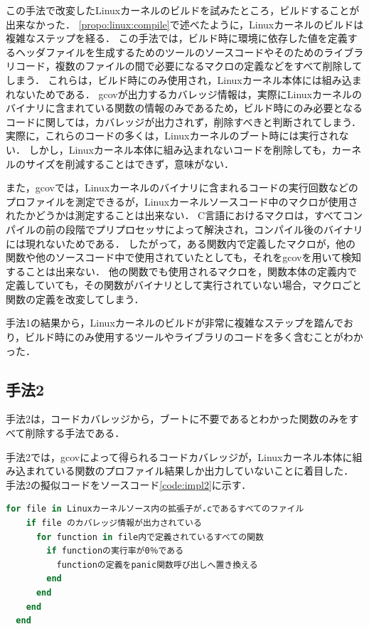 \documentclass[graduation-thesis]{mlarticle}
\begin{document}
この手法で改変したLinuxカーネルのビルドを試みたところ，ビルドすることが出来なかった．
\ref{propo:linux:compile}で述べたように，Linuxカーネルのビルドは複雑なステップを経る．
この手法では，ビルド時に環境に依存した値を定義するヘッダファイルを生成するためのツールのソースコードやそのためのライブラリコード，複数のファイルの間で必要になるマクロの定義などをすべて削除してしまう．
これらは，ビルド時にのみ使用され，Linuxカーネル本体には組み込まれないためである．
gcovが出力するカバレッジ情報は，実際にLinuxカーネルのバイナリに含まれている関数の情報のみであるため，ビルド時にのみ必要となるコードに関しては，カバレッジが出力されず，削除すべきと判断されてしまう．
実際に，これらのコードの多くは，Linuxカーネルのブート時には実行されない．
しかし，Linuxカーネル本体に組み込まれないコードを削除しても，カーネルのサイズを削減することはできず，意味がない．

また，gcovでは，Linuxカーネルのバイナリに含まれるコードの実行回数などのプロファイルを測定できるが，Linuxカーネルソースコード中のマクロが使用されたかどうかは測定することは出来ない．
C言語におけるマクロは，すべてコンパイルの前の段階でプリプロセッサによって解決され，コンパイル後のバイナリには現れないためである．
したがって，ある関数内で定義したマクロが，他の関数や他のソースコード中で使用されていたとしても，それをgcovを用いて検知することは出来ない．
他の関数でも使用されるマクロを，関数本体の定義内で定義していても，その関数がバイナリとして実行されていない場合，マクロごと関数の定義を改変してしまう．

手法1の結果から，Linuxカーネルのビルドが非常に複雑なステップを踏んでおり，ビルド時にのみ使用するツールやライブラリのコードを多く含むことがわかった．

\subsection{手法2}
\label{implementation:2}
手法2は，コードカバレッジから，ブートに不要であるとわかった関数のみをすべて削除する手法である．

手法2では，gcovによって得られるコードカバレッジが，Linuxカーネル本体に組み込まれている関数のプロファイル結果しか出力していないことに着目した．
手法2の擬似コードをソースコード\ref{code:impl2}に示す．

\begin{lstlisting}[language=ruby, caption=手法2の擬似コード, label=code:impl2]
  for file in Linuxカーネルソース内の拡張子が.cであるすべてのファイル
    if file のカバレッジ情報が出力されている
      for function in file内で定義されているすべての関数
        if functionの実行率が0％である
          functionの定義をpanic関数呼び出しへ置き換える
        end
      end
    end
  end
\end{lstlisting}
\end{document}
